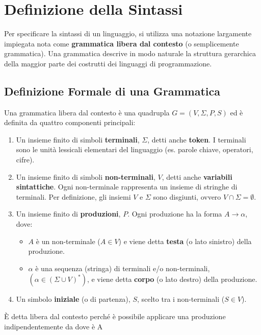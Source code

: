 \section{Definizione della Sintassi }

Per specificare la sintassi di un linguaggio, si utilizza una notazione largamente impiegata nota come \textbf{grammatica libera dal contesto} (o semplicemente grammatica). Una grammatica descrive in modo naturale la struttura gerarchica della maggior parte dei costrutti dei linguaggi di programmazione.


\subsection{Definizione Formale di una Grammatica }
Una grammatica libera dal contesto è una quadrupla $G = (V, \Sigma, P, S)$ ed è definita da quattro componenti principali:
\begin{enumerate}
    \item Un insieme finito di simboli \textbf{terminali}, $\Sigma$, detti anche \textbf{token}. I terminali sono le unità lessicali elementari del linguaggio (es. parole chiave, operatori, cifre).
    
    \item Un insieme finito di simboli \textbf{non-terminali}, $V$, detti anche \textbf{variabili sintattiche}. Ogni non-terminale rappresenta un insieme di stringhe di terminali. Per definizione, gli insiemi $V$ e $\Sigma$ sono disgiunti, ovvero $V \cap \Sigma = \emptyset$.
    
    \item Un insieme finito di \textbf{produzioni}, $P$. Ogni produzione ha la forma $A \rightarrow \alpha$, dove:
    \begin{itemize}
        \item $A$ è un non-terminale ($A \in V$) e viene detta \textbf{testa} (o lato sinistro) della produzione.
        \item $\alpha$ è una sequenza (stringa) di terminali e/o non-terminali, $(\alpha \in (\Sigma \cup V)^*)$, e viene detta \textbf{corpo} (o lato destro) della produzione.
    \end{itemize}
    
    \item Un simbolo \textbf{iniziale} (o di partenza), $S$, scelto tra i non-terminali ($S \in V$).

\end{enumerate}
È detta libera dal contesto perché è possibile applicare una produzione indipendentemente da dove è A

